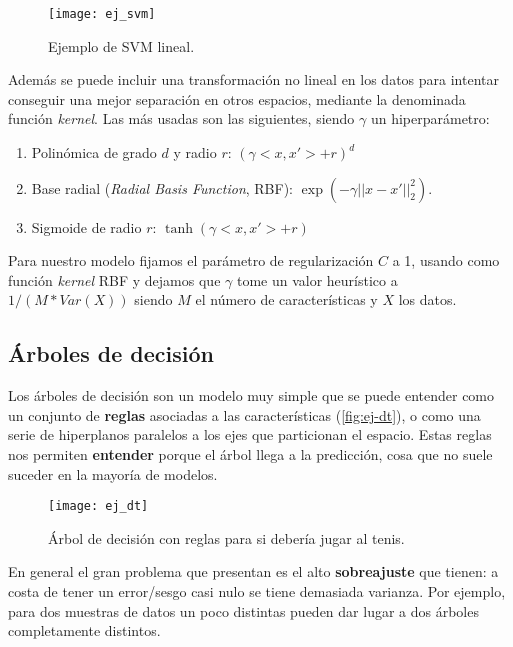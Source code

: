 \begin{figure}[htbp]
  \centering
  \texttt{[image: ej\_svm]}
  \caption{Ejemplo de SVM lineal.}
  \label{fig:ej-svm}
\end{figure}

Además se puede incluir una transformación no lineal en los datos para intentar conseguir una mejor separación en otros espacios, mediante la denominada función \emph{kernel}. Las más usadas son las siguientes, siendo $\gamma$ un hiperparámetro:

  \begin{enumerate}
    \item Polinómica de grado $d$ y radio $r$: $(\gamma<x, x'> + r)^d$
    \item Base radial (\emph{Radial Basis Function}, RBF): $\exp(-\gamma||x - x'||^2_2)$.
    \item Sigmoide de radio $r$: $\tanh(\gamma<x, x'> + r)$
  \end{enumerate}

Para nuestro modelo fijamos el parámetro de regularización $C$ a 1, usando como función \emph{kernel} RBF y dejamos que $\gamma$ tome un valor heurístico a $1 / (M * Var(X))$ siendo $M$ el número de características y $X$ los datos.

\subsection{Árboles de decisión}

Los árboles de decisión son un modelo muy simple que se puede entender como un conjunto de \textbf{reglas} asociadas a las características (\autoref{fig:ej-dt}), o como una serie de hiperplanos paralelos a los ejes que particionan el espacio. Estas reglas nos permiten \textbf{entender} porque el árbol llega a la predicción, cosa que no suele suceder en la mayoría de modelos.

\begin{figure}[htbp]
  \centering
  \texttt{[image: ej\_dt]}
  \caption{Árbol de decisión con reglas para si debería jugar al tenis.}
  \label{fig:ej-dt}
\end{figure}

En general el gran problema que presentan es el alto \textbf{sobreajuste} que tienen: a costa de tener un error/sesgo casi nulo se tiene demasiada varianza. Por ejemplo, para dos muestras de datos un poco distintas pueden dar lugar a dos árboles completamente distintos.

